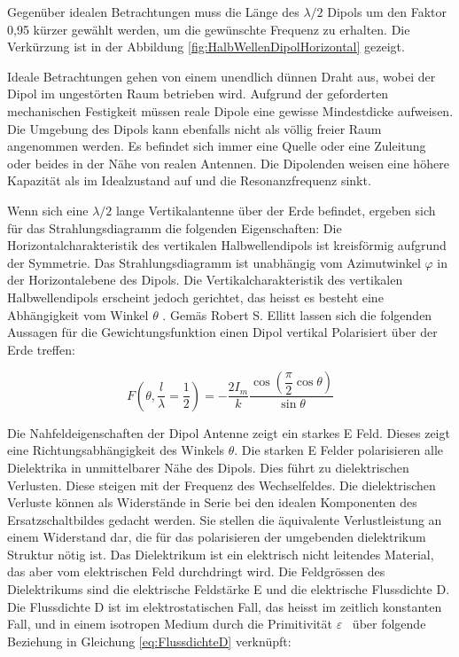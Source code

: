 Gegenüber idealen Betrachtungen muss die Länge des $\lambda /2$ Dipols um den Faktor 0,95 kürzer gewählt werden, um  die gewünschte Frequenz zu erhalten. Die Verkürzung  ist in der Abbildung \ref{fig:HalbWellenDipolHorizontal} gezeigt.

Ideale Betrachtungen gehen von einem unendlich dünnen Draht aus, wobei der Dipol im
ungestörten Raum betrieben wird. Aufgrund der geforderten mechanischen Festigkeit
müssen reale Dipole eine gewisse Mindestdicke aufweisen. Die Umgebung des Dipols kann
ebenfalls nicht als völlig freier Raum angenommen werden. Es befindet sich immer eine Quelle oder eine Zuleitung oder beides in der Nähe von realen Antennen. Die Dipolenden weisen eine höhere Kapazität als im Idealzustand auf und die Resonanzfrequenz sinkt. 

Wenn sich eine $\lambda /2$ lange Vertikalantenne über der Erde befindet,  ergeben sich für das Strahlungsdiagramm die folgenden Eigenschaften: 
Die Horizontalcharakteristik des vertikalen Halbwellendipols ist kreisförmig aufgrund der Symmetrie. Das Strahlungsdiagramm ist unabhängig vom Azimutwinkel $\varphi$ in der Horizontalebene des Dipols. Die Vertikalcharakteristik des vertikalen Halbwellendipols erscheint jedoch gerichtet, das heisst es besteht eine Abhängigkeit vom Winkel $\theta$ . 
Gemäs Robert S. Ellitt lassen sich die folgenden Aussagen für die Gewichtungsfunktion  einen Dipol vertikal Polarisiert über der Erde treffen:


\begin{equation}\label{eq:FDipolTheat}
F(\theta,\frac{l}{\lambda}=\dfrac{1}{2})=-\dfrac{2I_{m}}{k}\dfrac{\cos\left(\dfrac{\pi}{2}\cos\theta\right)}{\sin\theta}
\end{equation}


Die Nahfeldeigenschaften der Dipol Antenne zeigt ein starkes E Feld. Dieses zeigt eine Richtungsabhängigkeit  des Winkels $\theta$. Die starken E Felder polarisieren alle Dielektrika in unmittelbarer Nähe des Dipols. Dies führt zu dielektrischen Verlusten. Diese steigen mit der Frequenz des Wechselfeldes. Die dielektrischen Verluste können als Widerstände in Serie bei den idealen Komponenten des Ersatzschaltbildes gedacht werden. Sie stellen die äquivalente Verlustleistung an einem Widerstand dar, die für das polarisieren der umgebenden dielektrikum Struktur nötig ist.
Das Dielektrikum ist ein elektrisch nicht leitendes Material, das aber vom elektrischen Feld durchdringt wird. Die Feldgrössen des Dielektrikums sind die elektrische Feldstärke E und die elektrische Flussdichte D. Die Flussdichte D ist  im elektrostatischen Fall, das heisst im zeitlich konstanten Fall, und in einem isotropen Medium durch die Primitivität $\varepsilon $ \ über folgende Beziehung in Gleichung \ref{eq:FlussdichteD} verknüpft:



